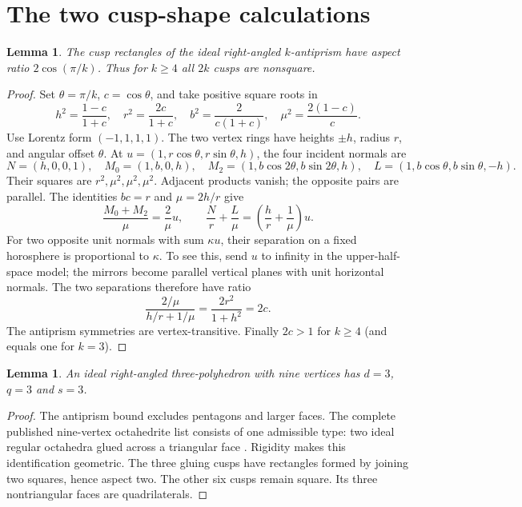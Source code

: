 \documentclass[11pt]{article}
\newtheorem{lemma}[theorem]{Lemma}
\theoremstyle{remark}
\begin{document}
\section{The two cusp-shape calculations}
\begin{lemma}\label{lem:antiprism}
The cusp rectangles of the ideal right-angled $k$-antiprism have
aspect ratio $2\cos(\pi/k)$. Thus for $k\ge4$ all $2k$ cusps
are nonsquare.
\end{lemma}
\begin{proof}
Set $\theta=\pi/k$, $c=\cos\theta$, and take positive square roots in
\[
 h^2=\frac{1-c}{1+c},\quad r^2=\frac{2c}{1+c},\quad
 b^2=\frac{2}{c(1+c)},\quad \mu^2=\frac{2(1-c)}{c}.
\]
Use Lorentz form $(-1,1,1,1)$. The two vertex rings have heights
$\pm h$, radius $r$, and angular offset $\theta$. At
$u=(1,r\cos\theta,r\sin\theta,h)$, the four incident normals are
\[
 N=(h,0,0,1),\quad M_0=(1,b,0,h),\quad
 M_2=(1,b\cos2\theta,b\sin2\theta,h),\quad
 L=(1,b\cos\theta,b\sin\theta,-h).
\]
Their squares are $r^2,\mu^2,\mu^2,\mu^2$. Adjacent products vanish;
the opposite pairs are parallel. The identities $bc=r$ and
$\mu=2h/r$ give
\[
 \frac{M_0+M_2}{\mu}=\frac2\mu u,\qquad
 \frac Nr+\frac L\mu=\left(\frac hr+\frac1\mu\right)u.
\]
For two opposite unit normals with sum $\kappa u$, their separation
on a fixed horosphere is proportional to $\kappa$. To see this,
send $u$ to infinity in the upper-half-space model; the mirrors become
parallel vertical planes with unit horizontal normals. The two
separations therefore have ratio
\[
 \frac{2/\mu}{h/r+1/\mu}
 =\frac{2r^2}{1+h^2}=2c.
\]
The antiprism symmetries are vertex-transitive. Finally $2c>1$ for
$k\ge4$ (and equals one for $k=3$).
\end{proof}

\begin{lemma}\label{lem:nine}
An ideal right-angled three-polyhedron with nine vertices has
$d=3$, $q=3$ and $s=3$.
\end{lemma}
\begin{proof}
The antiprism bound excludes pentagons and larger faces. The complete
published nine-vertex octahedrite list consists of one admissible type:
two ideal regular octahedra glued across a triangular face
\cite[Section~4.3, Case~D2 and Figure~6]{Kolpakov}. Rigidity makes
this identification geometric. The three gluing cusps have rectangles
formed by joining two squares, hence aspect two. The other six cusps
remain square. Its three nontriangular faces are quadrilaterals.
\end{proof}
\end{document}
